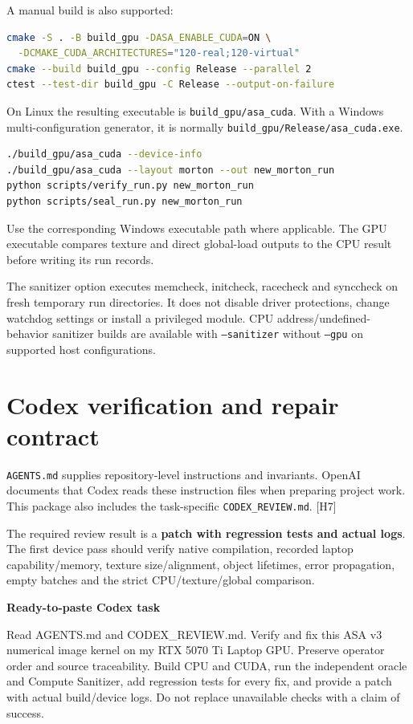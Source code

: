 \documentclass[11pt,a4paper]{article}
\newcommand{\hw}[1]{\textcolor{muted}{[H#1]}}
\newcommand{\code}[1]{\texttt{#1}}
\begin{document}
A manual build is also supported:
\begin{lstlisting}[language=bash]
cmake -S . -B build_gpu -DASA_ENABLE_CUDA=ON \
  -DCMAKE_CUDA_ARCHITECTURES="120-real;120-virtual"
cmake --build build_gpu --config Release --parallel 2
ctest --test-dir build_gpu -C Release --output-on-failure
\end{lstlisting}
On Linux the resulting executable is \code{build\_gpu/asa\_cuda}. With a Windows multi-configuration generator, it is normally \code{build\_gpu/Release/asa\_cuda.exe}.
\begin{lstlisting}[language=bash]
./build_gpu/asa_cuda --device-info
./build_gpu/asa_cuda --layout morton --out new_morton_run
python scripts/verify_run.py new_morton_run
python scripts/seal_run.py new_morton_run
\end{lstlisting}
Use the corresponding Windows executable path where applicable. The GPU executable compares texture and direct global-load outputs to the CPU result before writing its run records.

The sanitizer option executes memcheck, initcheck, racecheck and synccheck on fresh temporary run directories. It does not disable driver protections, change watchdog settings or install a privileged module. CPU address/undefined-behavior sanitizer builds are available with \code{--sanitizer} without \code{--gpu} on supported host configurations.
\clearpage

\section{Codex verification and repair contract}
\code{AGENTS.md} supplies repository-level instructions and invariants. OpenAI documents that Codex reads these instruction files when preparing project work. This package also includes the task-specific \code{CODEX\_REVIEW.md}. \hw{7}

The required review result is a \textbf{patch with regression tests and actual logs}. The first device pass should verify native compilation, recorded laptop capability/memory, texture size/alignment, object lifetimes, error propagation, empty batches and the strict CPU/texture/global comparison.

\begin{panel}
\textbf{Ready-to-paste Codex task}\par
Read AGENTS.md and CODEX\_REVIEW.md. Verify and fix this ASA v3 numerical image kernel on my RTX 5070 Ti Laptop GPU. Preserve operator order and source traceability. Build CPU and CUDA, run the independent oracle and Compute Sanitizer, add regression tests for every fix, and provide a patch with actual build/device logs. Do not replace unavailable checks with a claim of success.
\end{panel}
\end{document}
